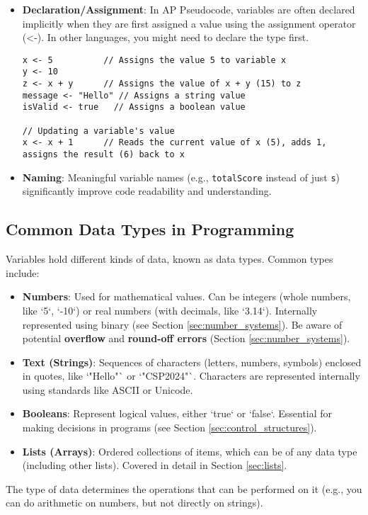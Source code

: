 \documentclass[11pt,oneside]{book}
\begin{document}
\begin{itemize}
\item \textbf{Declaration/Assignment}: In AP Pseudocode, variables are often declared implicitly when they are first assigned a value using the assignment operator (<-). In other languages, you might need to declare the type first.
\begin{lstlisting}[language=APCSP, label={lst:assignment_detail}, caption={AP Pseudocode: Assignment Examples}]
x <- 5          // Assigns the value 5 to variable x
y <- 10
z <- x + y      // Assigns the value of x + y (15) to z
message <- "Hello" // Assigns a string value
isValid <- true   // Assigns a boolean value

// Updating a variable's value
x <- x + 1      // Reads the current value of x (5), adds 1, assigns the result (6) back to x
\end{lstlisting}
\item \textbf{Naming}: Meaningful variable names (e.g., \texttt{totalScore} instead of just \texttt{s}) significantly improve code readability and understanding.
\end{itemize}

\subsection*{Common Data Types in Programming}
Variables hold different kinds of data, known as data types. Common types include:
\begin{itemize}
    \item \textbf{Numbers}: Used for mathematical values. Can be integers (whole numbers, like `5`, `-10`) or real numbers (with decimals, like `3.14`). Internally represented using binary (see Section \ref{sec:number_systems}). Be aware of potential \textbf{overflow} and \textbf{round-off errors} (Section \ref{sec:number_systems}).
    \item \textbf{Text (Strings)}: Sequences of characters (letters, numbers, symbols) enclosed in quotes, like `"Hello"` or `"CSP2024"`. Characters are represented internally using standards like ASCII or Unicode.
    \item \textbf{Booleans}: Represent logical values, either `true` or `false`. Essential for making decisions in programs (see Section \ref{sec:control_structures}).
    \item \textbf{Lists (Arrays)}: Ordered collections of items, which can be of any data type (including other lists). Covered in detail in Section \ref{sec:lists}.
\end{itemize}
The type of data determines the operations that can be performed on it (e.g., you can do arithmetic on numbers, but not directly on strings).
\end{document}
